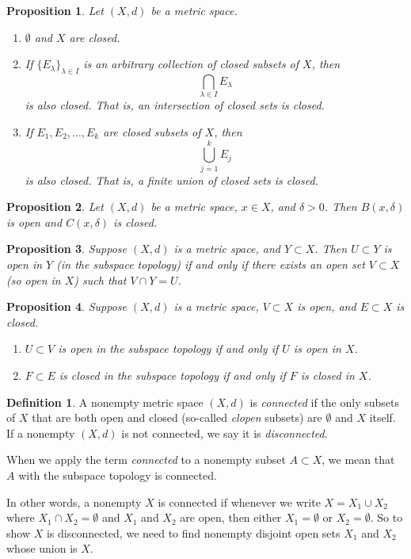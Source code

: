 \documentclass{article}
\newtheorem{proposition}{Proposition}[section]
\theoremstyle{definition}
\newtheorem{definition}{Definition}[section]
\theoremstyle{remark}
\begin{document}
\begin{proposition} \label{prop:closed_sets}
Let \( (X, d) \) be a metric space.
\begin{enumerate}
\item \( \emptyset \) and \( X \) are closed.
\item If \( \{ E_{\lambda} \}_{\lambda \in I} \) is an arbitrary collection of closed subsets of \( X \), then
\[
\bigcap_{\lambda \in I} E_{\lambda}
\]
is also closed. That is, an intersection of closed sets is closed.
\item If \( E_1, E_2, \dots, E_k \) are closed subsets of \( X \), then
\[
\bigcup_{j=1}^{k} E_j
\]
is also closed. That is, a finite union of closed sets is closed.
\end{enumerate}
\end{proposition}

\begin{proposition} \label{prop:open_closed_ball}
Let \( (X, d) \) be a metric space, \( x \in X \), and \( \delta > 0 \). Then \( B(x, \delta) \) is open and \( C(x, \delta) \) is closed.
\end{proposition}

\begin{proposition} \label{prop:subspace_topology}
Suppose \( (X, d) \) is a metric space, and \( Y \subset X \). Then \( U \subset Y \) is open in \( Y \) (in the subspace topology) if and only if there exists an open set \( V \subset X \) (so open in \( X \)) such that \( V \cap Y = U \).
\end{proposition}

\begin{proposition} \label{prop:subspace_topology_open_closed}
Suppose \( (X, d) \) is a metric space, \( V \subset X \) is open, and \( E \subset X \) is closed.
\begin{enumerate}
\item \( U \subset V \) is open in the subspace topology if and only if \( U \) is open in \( X \).
\item \( F \subset E \) is closed in the subspace topology if and only if \( F \) is closed in \( X \).
\end{enumerate}
\end{proposition}


\begin{definition} \label{def:connected_space}
A nonempty metric space \( (X, d) \) is \textit{connected} if the only subsets of \( X \) that are both open and closed (so-called \textit{clopen} subsets) are \( \emptyset \) and \( X \) itself. If a nonempty \( (X, d) \) is not connected, we say it is \textit{disconnected}. 

When we apply the term \textit{connected} to a nonempty subset \( A \subset X \), we mean that \( A \) with the subspace topology is connected.

In other words, a nonempty \( X \) is connected if whenever we write \( X = X_1 \cup X_2 \) where \( X_1 \cap X_2 = \emptyset \) and \( X_1 \) and \( X_2 \) are open, then either \( X_1 = \emptyset \) or \( X_2 = \emptyset \). So to show \( X \) is disconnected, we need to find nonempty disjoint open sets \( X_1 \) and \( X_2 \) whose union is \( X \).
\end{definition}
\end{document}
